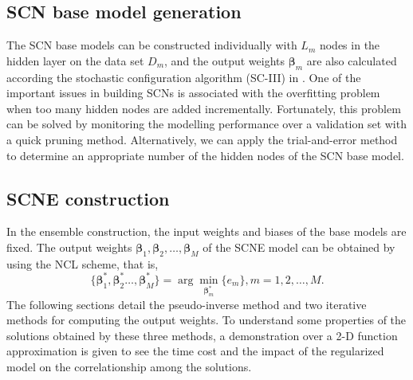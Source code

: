 \documentclass{article}
\begin{document}
\subsection{SCN base model generation}
The SCN base models can be constructed individually with $L_m$ nodes in the hidden layer on the data set $D_m$, and the output weights $\bm{\beta}_m$ are also calculated according the stochastic configuration algorithm (SC-III) in \cite{WangandLi_SCN}.
One of the important issues in building SCNs is associated with the overfitting problem when too many hidden nodes are added incrementally.
Fortunately, this problem can be solved by monitoring the modelling performance over a validation set with a quick pruning method. 
Alternatively, we can apply the trial-and-error method to determine an appropriate number of the hidden nodes of the SCN base model.

\subsection{SCNE construction}
In the ensemble construction, the input weights and biases of the base models are fixed. 
The output weights $\bm{\beta}_1, \bm{\beta}_2, \dots, \bm{\beta}_M$ of the SCNE model can be obtained by using the NCL scheme, that is, 
\begin{equation}
\label{Eq16_TheB}
\{ \bm{\beta}_1^*, \bm{\beta}_2^* \dots, \bm{\beta}_M^* \} =\arg \min_{\bm{\beta}_m^*}\{e_m\}, m= 1,2,\dots,M.
\end{equation}
The following sections detail the pseudo-inverse method and two iterative methods for computing the output weights.
To understand some properties of the solutions obtained by these three methods, a demonstration over a 2-D function approximation is given to see the time cost and the impact of the regularized model on the correlationship among the solutions.


\end{document}

